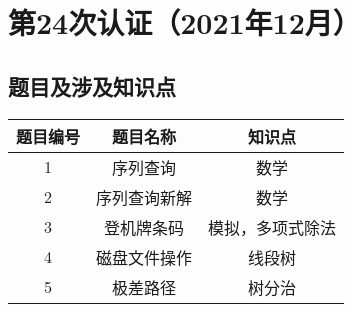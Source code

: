 \documentclass[cn,10pt,math=newtx,citestyle=gb7714-2015,bibstyle=gb7714-2015]{elegantbook}
\begin{document}

% 

% 

% 

% 

% 

\chapter{第24次认证（2021年12月）}

\section{题目及涉及知识点}

\begin{table}[htbp]
  \centering
  \begin{tabular}{ccc}
    \toprule
    题目编号 & 题目名称 & 知识点\\
    \midrule
    1 & 序列查询 & 数学\\
    2 & 序列查询新解 & 数学\\
    3 & 登机牌条码 & 模拟，多项式除法\\
    4 & 磁盘文件操作 & 线段树\\
    5 & 极差路径 & 树分治\\
    \bottomrule
  \end{tabular}
\end{table}










\end{document}
